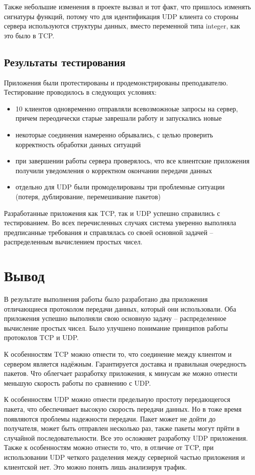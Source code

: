 \documentclass[a4paper,14pt]{extarticle}
\begin{document}
Также небольшие изменения в проекте вызвал и тот факт, что пришлось изменять сигнатуры функций, потому что для идентификация UDP клиента со стороны сервера используются структуры данных, вместо переменной типа integer, как это было в TCP.

\subsection{Результаты тестирования}

Приложения были протестированы и продемонстрированы преподавателю. Тестирование проводилось в следующих условиях:
\begin{itemize}
\item 10 клиентов одновременно отправляли всевозможноые запросы на сервер, причем переодически старые заврешали работу и запускались новые
\item некоторые соединения намеренно обрывались, с целью проверить корректность обработки данных ситуаций
\item при завершении работы сервера проверялось, что все клиентские приложения получили уведомления о корректном окончании передачи данных
\item отдельно для UDP были промоделированы три проблемные ситуации (потеря, дублирование, перемешивание пакетов)
\end{itemize}
Разработанные приложения как TCP, так и UDP успешно справились с тестированием. Во всех перечисленных случаях система уверенно выполняла предписанные требования и справлялась со своей основной задачей -- распределенным вычислением простых чисел.

\section{Вывод}
В результате выполнения работы было разработано два приложения отличающиеся протоколом передачи данных, который они использовали. Оба приложения успешно выполняли свою основную задачу -- распределенное вычисление простых чисел. Было улучшено понимание принципов работы протоколов TCP и UDP.

К особенностям TCP можно отнести то, что соединение между клиентом и сервером является надёжным. Гарантируется доставка и правильная очередность пакетов. Что облегчает разработку приложения, к минусам же можно отнести меньшую скорость работы по сравнению с UDP.

К особенностям UDP можно отнести предельную простоту передающегося пакета, что обеспечивает высокую скорость передачи данных. Но в тоже время появляются проблемы надежности передачи. Пакет может не дойти до получателя, может быть отправлен несколько раз, также пакеты могут прйти в случайной последовательности. Все это осложняет разработку UDP приложения. Также к особенностям можно отнести то, что, в отличие от TCP, при использовании UDP четкого разделения между серверной частью приложения и клиентской нет. Это можно понять лишь анализируя трафик.
\end{document}
